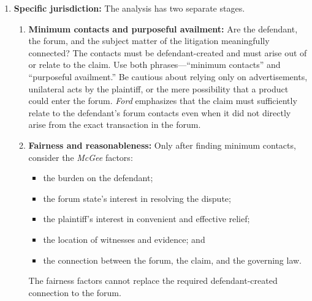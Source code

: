 \documentclass[11pt]{tex/lawoutline}
\begin{document}
{\begin{enumerate}
    \item \textbf{Specific jurisdiction:} The analysis has two separate stages.
    \begin{enumerate}
        \item \textbf{Minimum contacts and purposeful availment:} Are the defendant, the forum, and the subject matter of the litigation meaningfully connected? The contacts must be defendant-created and must arise out of or relate to the claim. Use both phrases---``minimum contacts'' and ``purposeful availment.'' Be cautious about relying only on advertisements, unilateral acts by the plaintiff, or the mere possibility that a product could enter the forum. \textit{Ford} emphasizes that the claim must sufficiently relate to the defendant's forum contacts even when it did not directly arise from the exact transaction in the forum.
        \item \textbf{Fairness and reasonableness:} Only after finding minimum contacts, consider the \textit{McGee} factors:
        \begin{itemize}
            \item the burden on the defendant;
            \item the forum state's interest in resolving the dispute;
            \item the plaintiff's interest in convenient and effective relief;
            \item the location of witnesses and evidence; and
            \item the connection between the forum, the claim, and the governing law.
        \end{itemize}
        The fairness factors cannot replace the required defendant-created connection to the forum.
    \end{enumerate}
\end{enumerate}
}
\end{document}
